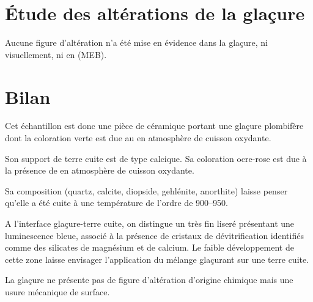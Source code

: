 \section{Étude des altérations de la glaçure}

Aucune figure d'altération n'a été mise en évidence dans la glaçure, 
ni visuellement, ni en \MEB[ie] (MEB).


\section{Bilan}

Cet échantillon est donc une pièce de céramique portant une 
glaçure plombifère dont la coloration verte est due au  
en atmosphère de cuisson oxydante.

Son support de terre cuite est de type calcique. Sa coloration 
ocre-rose est due à la présence de  en atmosphère de 
cuisson oxydante.

Sa composition \cristallo (quartz, calcite, diopside, 
gehlénite, anorthite) laisse penser qu'elle a été cuite à une 
température de l'ordre de 
\SIrange[range-phrase=\ à\ ]{900}{950}{\degC}.

A l'interface glaçure-terre cuite, on distingue un très fin liseré 
présentant une luminescence bleue, associé à la présence de cristaux 
de dévitrification identifiés comme des silicates de magnésium et de 
calcium. Le faible développement de cette zone laisse envisager 
l'application du mélange glaçurant sur une terre cuite.

La glaçure ne présente pas de figure d'altération d'origine chimique 
mais une usure mécanique de surface.
